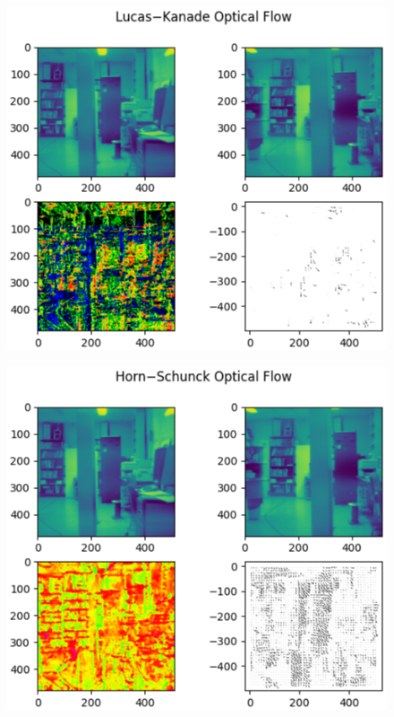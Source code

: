\documentclass[9pt]{IEEEtran}
\begin{document}
\begin{figure}[h]
    \centering
    \includegraphics[width=1\columnwidth]{lab2lk.eps}
    \label{fig:lab2lk}
\end{figure}
\begin{figure}[h]
    \centering
    \includegraphics[width=1\columnwidth, scale=0.5]{lab2hs.eps}
    \label{fig:lab2hs}
\end{figure}
\end{document}

